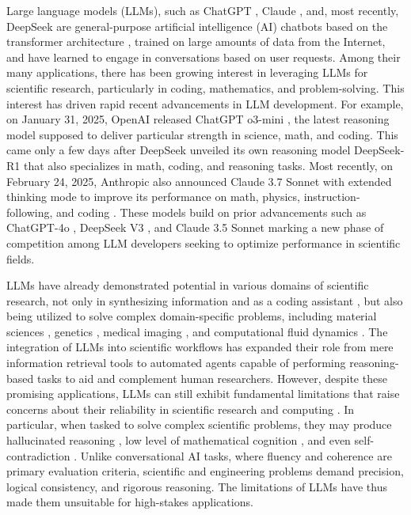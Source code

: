 \documentclass{article}
\begin{document}
Large language models (LLMs), such as ChatGPT \cite{openai_gpt_4o_2024, openai_o3_mini_2025, openai_o3_mini_system_card_2024}, Claude \cite{anthropicclaude3.7sonnet}, and, most recently, DeepSeek \cite{deepseekai2024deepseekv3technicalreport} are general-purpose artificial intelligence (AI) chatbots based on the transformer architecture \cite{waswani2017attention}, trained on large amounts of data from the Internet, and have learned to engage in conversations based on user requests. Among their many applications, there has been growing interest in leveraging LLMs for scientific research, particularly in coding, mathematics, and problem-solving. This interest has driven rapid recent advancements in LLM development. For example, on January 31, 2025, OpenAI released ChatGPT o3-mini \cite{openai_o3_mini_2025}, the latest reasoning model supposed to deliver particular strength in science, math, and coding. This came only a few days after DeepSeek unveiled its own reasoning model DeepSeek-R1 \cite{deepseekai2025deepseekr1incentivizingreasoningcapability} that also specializes in math, coding, and reasoning tasks. Most recently, on February 24, 2025, Anthropic also announced  Claude 3.7 Sonnet with extended thinking mode to improve its performance on math, physics, instruction-following, and coding \cite{anthropicclaude3.7sonnet}.
These models build on prior advancements such as ChatGPT-4o \cite{openai_gpt_4o_2024}, DeepSeek V3 \cite{deepseekai2024deepseekv3technicalreport}, and Claude 3.5 Sonnet \cite{anthropicclaude3.5sonnet} marking a new phase of competition among LLM developers seeking to optimize performance in scientific fields.

LLMs have already demonstrated potential in various domains of scientific research, not only in synthesizing information \cite{antu2023using, li2024chatcite} and as a coding assistant \cite{nam2024using, liu2024exploring, chew2023llm}, but also being utilized to solve complex domain-specific problems, including material sciences \cite{zhang2024honeycomb, hong2023chatgpt, cheng2023challenges}, genetics \cite{chatterjee2023can, mcgrath2024comparative}, medical imaging \cite{srivastav2023chatgpt, hu2024advancing, yang2023impact}, and computational fluid dynamics \cite{chen2024metaopenfoam, sawada2011llm, herzog2002llm}. The integration of LLMs into scientific workflows has expanded their role from mere information retrieval tools to automated agents capable of performing reasoning-based tasks to aid and complement human researchers. However, despite these promising applications, LLMs can still exhibit fundamental limitations that raise concerns about their reliability in scientific research and computing \cite{hadi2023survey, rossi2024problems, rane2023contribution, pal2024ai, kunz2024properties}. In particular, when tasked to solve complex scientific problems, they may produce hallucinated reasoning \cite{li2023deceptive}, low level of mathematical cognition \cite{evans2024evaluating}, and even self-contradiction \cite{mundler2023self}. Unlike conversational AI tasks, where fluency and coherence are primary evaluation criteria, scientific and engineering problems demand precision,  logical consistency, and rigorous reasoning. The limitations of LLMs have thus made them unsuitable for high-stakes applications. 
 
\end{document}
